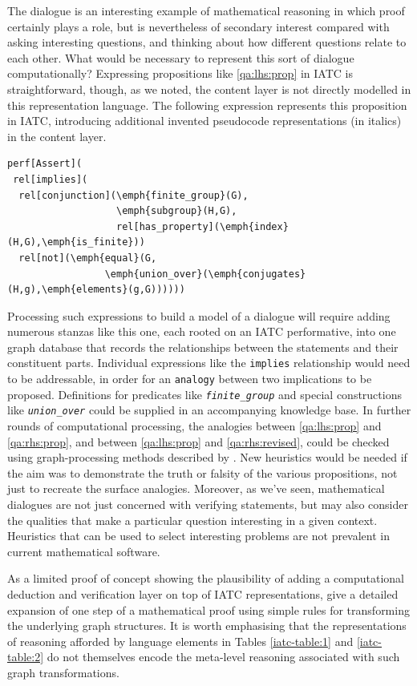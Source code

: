 \documentclass[smallextended,oneside]{svjour3}       %
\begin{document}
The dialogue is an interesting example of mathematical reasoning in
which proof certainly plays a role, but is nevertheless of secondary
interest compared with asking interesting questions, and thinking
about how different questions relate to each other.
What would be necessary to represent this sort of dialogue computationally?
Expressing propositions like \ref{qa:lhs:prop} in IATC is 
straightforward, though, as we noted, the content layer is not
directly modelled in this representation language.  The
following expression represents this proposition in IATC, introducing
additional invented pseudocode representations (in italics) in the content layer.

\begin{Verbatim}[commandchars=\\\{\}]
perf[Assert](
 rel[implies](
  rel[conjunction](\emph{finite_group}(G),
                   \emph{subgroup}(H,G),
                   rel[has_property](\emph{index}(H,G),\emph{is_finite}))
  rel[not](\emph{equal}(G,
                 \emph{union_over}(\emph{conjugates}(H,g),\emph{elements}(g,G))))))
\end{Verbatim}

Processing such expressions to build a model of a dialogue
will require adding numerous stanzas like this one, each rooted on an IATC
performative, into one graph database that records the relationships
between the statements and their constituent parts.  Individual expressions
like the \texttt{implies} relationship would need to be addressable,
in order for an \texttt{analogy} between two implications to be
proposed.
Definitions for predicates like \texttt{\textit{finite_group}}
and special constructions like \texttt{\textit{union_over}}
could be supplied in an accompanying knowledge base.   In further rounds of
computational processing, the analogies between
\ref{qa:lhs:prop} and \ref{qa:rhs:prop}, and between
\ref{qa:lhs:prop} and \ref{qa:rhs:revised}, could be checked
 using graph-processing methods described
by \citet{sowa2003analogical}.  
New heuristics would be needed
if the aim was to demonstrate the truth or falsity of the various
propositions, not just to recreate the surface analogies.
Moreover, as we've seen, mathematical dialogues are not just concerned
with verifying statements, but may
also consider the qualities that make a particular
question interesting in a given context.   Heuristics that can 
be used to select interesting problems are not prevalent in current 
mathematical software.

As a limited proof of concept showing the plausibility of adding a
computational deduction and verification layer on top of IATC
representations, \citet{corneli2017modelling} give a detailed
expansion of one step of a mathematical proof using simple rules
for transforming the underlying graph structures.
It is worth emphasising that the representations
of reasoning afforded by language elements in Tables
\ref{iatc-table:1} and \ref{iatc-table:2} do not themselves
encode the meta-level reasoning associated with such graph transformations.
\end{document}
